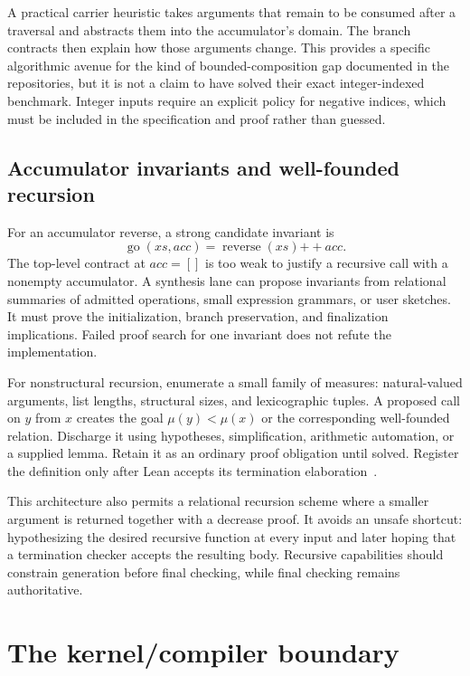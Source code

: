 A practical carrier heuristic takes arguments that remain to be consumed after a traversal and abstracts them into the accumulator's domain. The branch contracts then explain how those arguments change. This provides a specific algorithmic avenue for the kind of bounded-composition gap documented in the repositories, but it is not a claim to have solved their exact integer-indexed benchmark. Integer inputs require an explicit policy for negative indices, which must be included in the specification and proof rather than guessed.

\subsection{Accumulator invariants and well-founded recursion}

For an accumulator reverse, a strong candidate invariant is
\[
 \operatorname{go}(xs,acc)=\operatorname{reverse}(xs)\mathbin{+\!+}acc.
\]
The top-level contract at $acc=[]$ is too weak to justify a recursive call with a nonempty accumulator. A synthesis lane can propose invariants from relational summaries of admitted operations, small expression grammars, or user sketches. It must prove the initialization, branch preservation, and finalization implications. Failed proof search for one invariant does not refute the implementation.

For nonstructural recursion, enumerate a small family of measures: natural-valued arguments, list lengths, structural sizes, and lexicographic tuples. A proposed call on $y$ from $x$ creates the goal $\mu(y)<\mu(x)$ or the corresponding well-founded relation. Discharge it using hypotheses, simplification, arithmetic automation, or a supplied lemma. Retain it as an ordinary proof obligation until solved. Register the definition only after Lean accepts its termination elaboration~\cite{lean-recursion}.

This architecture also permits a relational recursion scheme where a smaller argument is returned together with a decrease proof. It avoids an unsafe shortcut: hypothesizing the desired recursive function at every input and later hoping that a termination checker accepts the resulting body. Recursive capabilities should constrain generation before final checking, while final checking remains authoritative.

\section{The kernel/compiler boundary}
\label{sec:compiler}

